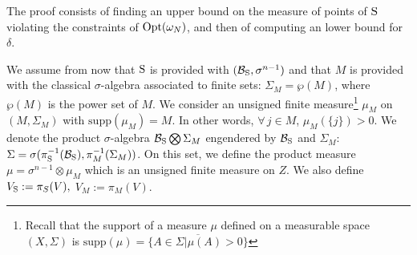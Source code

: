 The proof consists of finding an upper bound on the measure of points of $\text{S}$ violating the constraints of $\text{Opt}(\omega_N)$, and then of computing an lower bound for $\delta$.

We assume from now that $\text{S}$ is provided with $(\mathcal{B}_{\text{S}},\sigma^{n-1})$ and that $M$ is provided with the classical $\sigma$-algebra associated to finite sets: $\Sigma_M = \wp(M)$, where $\wp(M)$ is the power set of $M$. We consider an unsigned finite measure\footnote{Recall that the support of a measure $\mu$ defined on a measurable space $(X, \Sigma)$ is $\text{supp}(\mu) = \overline{\{A \in \Sigma | \mu(A) > 0 \}}$} $\mu_M$ on $(M, \Sigma_M)$ with $\text{supp} (\mu_M) = M$. In other words, $\forall\,j \in M$, $\mu_M(\{j\})  > 0$. We denote the product $\sigma$-algebra $\mathcal{B}_{\text{S}} \bigotimes \Sigma_M$ engendered by $\mathcal{B}_{\text{S}}$ and $\Sigma_M$: $\Sigma = \sigma( \pi_{\text{S}}^{-1}(\mathcal{B}_{\text{S}}),  \pi_{M}^{-1}(\Sigma_M))$. On this set, we define the product measure $\mu = \sigma^{n-1} \otimes \mu_M$ which is an unsigned finite measure on $Z$. We also define $V_{\text{S}}:=\pi_S(V),$ $V_M:=\pi_M(V)$.